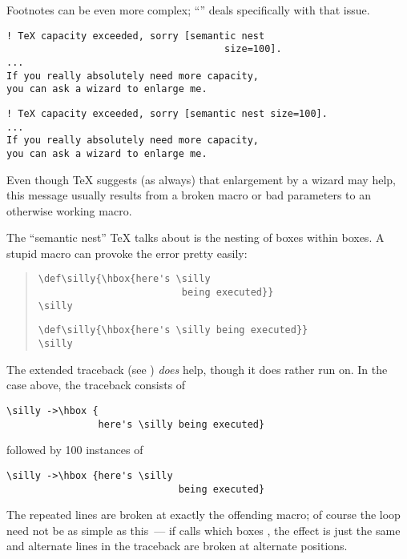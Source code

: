 Footnotes can be even more complex; %
``''
deals specifically with that issue.


\begin{narrowversion}
\begin{verbatim}
! TeX capacity exceeded, sorry [semantic nest
                                      size=100].
...
If you really absolutely need more capacity,
you can ask a wizard to enlarge me.
\end{verbatim}
\end{narrowversion}
\begin{wideversion}
\begin{verbatim}
! TeX capacity exceeded, sorry [semantic nest size=100].
...
If you really absolutely need more capacity,
you can ask a wizard to enlarge me.
\end{verbatim}
\end{wideversion}
Even though \TeX{} suggests (as always) that enlargement by a wizard
may help, this message usually results from a broken macro or bad
parameters to an otherwise working macro.

The ``semantic nest'' \TeX{} talks about is the nesting
of boxes within boxes.  A stupid macro can provoke the error pretty
easily:
\begin{quote}
\begin{narrowversion}
\begin{verbatim}
\def\silly{\hbox{here's \silly
                         being executed}}
\silly
\end{verbatim}
\end{narrowversion}
\begin{wideversion}
\begin{verbatim}
\def\silly{\hbox{here's \silly being executed}}
\silly
\end{verbatim}
\end{wideversion}
\end{quote}
The extended traceback
(see )
\emph{does} help, though it does rather run on.  In the case above,
the traceback consists of
\begin{verbatim}
\silly ->\hbox {
                here's \silly being executed}
\end{verbatim}
followed by 100 instances of
\begin{verbatim}
\silly ->\hbox {here's \silly 
                              being executed}
\end{verbatim}
The repeated lines are broken at exactly the offending macro; of
course the loop need not be as simple as this~--- if  calls
 which boxes , the effect is just the same and
alternate lines in the traceback are broken at alternate positions.

